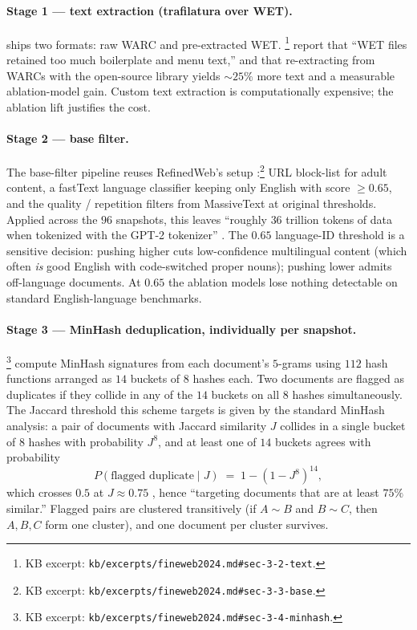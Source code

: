 \paragraph{Stage 1 --- text extraction (trafilatura over WET).}
 ships two formats: raw WARC and pre-extracted WET.
\citet[\S 3.2]{fineweb2024}\footnote{KB excerpt:
\nolinkurl{kb/excerpts/fineweb2024.md#sec-3-2-text}.} report that
``WET files retained too much boilerplate and menu text,'' and that
re-extracting from WARCs with the open-source \texttt{}
library yields $\sim 25\%$ more text and a measurable ablation-model
gain. Custom text extraction is computationally expensive; the
ablation lift justifies the cost.

\paragraph{Stage 2 --- base filter.}
The base-filter pipeline reuses RefinedWeb's setup
\citep[\S 3.3]{fineweb2024}:\footnote{KB excerpt:
\nolinkurl{kb/excerpts/fineweb2024.md#sec-3-3-base}.} URL block-list
for adult content, a fastText language classifier keeping only
English with score $\geq 0.65$, and the quality / repetition filters
from MassiveText at original thresholds. Applied across the $96$
snapshots, this leaves ``roughly $36$ trillion tokens of data when
tokenized with the GPT-2 tokenizer''
\citep[\S 3.3]{fineweb2024}. The $0.65$ language-ID threshold is a
sensitive decision: pushing higher cuts low-confidence multilingual
content (which often \emph{is} good English with code-switched
proper nouns); pushing lower admits off-language documents.
At $0.65$ the ablation models lose nothing detectable on standard
English-language benchmarks.

\paragraph{Stage 3 --- MinHash deduplication, individually per snapshot.}
\citet[\S 3.4]{fineweb2024}\footnote{KB excerpt:
\nolinkurl{kb/excerpts/fineweb2024.md#sec-3-4-minhash}.} compute
MinHash signatures from each document's $5$-grams using $112$ hash
functions arranged as $14$ buckets of $8$ hashes each. Two documents
are flagged as duplicates if they collide in any of the $14$ buckets
on all $8$ hashes simultaneously. The Jaccard threshold this scheme
targets is given by the standard MinHash analysis: a pair of
documents with Jaccard similarity $J$ collides in a single bucket of
$8$ hashes with probability $J^{8}$, and at least one of $14$
buckets agrees with probability
\begin{equation}
P(\text{flagged duplicate} \mid J) \;=\; 1 - (1 - J^{8})^{14},
\label{eq:minhash}
\end{equation}
which crosses $0.5$ at $J \approx 0.75$
\citep[\S 3.4]{fineweb2024}, hence ``targeting documents that are
at least $75\%$ similar.'' Flagged pairs are clustered transitively
(if $A \sim B$ and $B \sim C$, then $A, B, C$ form one cluster), and
one document per cluster survives.

